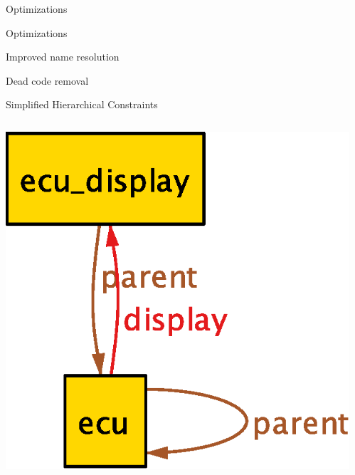 \documentclass[table,15pt,t]{beamer}
\newcommand{\vmiddle}[1]{
  \vspace{\stretch{1}}
  #1
  \vspace{\stretch{1}}
}
\newcommand{\interframe}[1]{
\begin{frame}{}
\vmiddle{\hmiddle{\Huge #1}}
\end{frame}
}
\newcommand{\mlist}[1]{
\vmiddle{
  \begin{list}{}{}
    #1
  \end{list}
  }
}
\newcommand{\hmiddle}[1]{
  \begin{center}#1\end{center}
}
\newcounter{i}
\begin{document}
\interframe{Optimizations}

\begin{frame}{Optimizations}
 \mlist{
    \item Improved name resolution
    \item Dead code removal
 }
\end{frame}

\begin{frame}{Simplified Hierarchical Constraints}
  \begin{columns}
    \begin{column}{0.5\textwidth}
      \includegraphics[scale=0.5]{figs/parent-old}
    \end{column}
    \begin{column}{0.5\textwidth}

\end{column}
\end{columns}
\end{frame}
\end{document}
